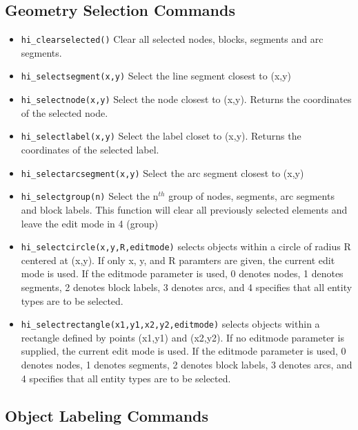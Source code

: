 \subsection{Geometry Selection Commands}

\begin{itemize}
\item {\tt hi\_clearselected()} Clear all selected nodes, blocks, segments and arc
segments.

\item {\tt hi\_selectsegment(x,y)} Select the line segment closest to (x,y)

\item {\tt hi\_selectnode(x,y)} Select the node closest to (x,y).
Returns the coordinates of the selected node.

\item {\tt hi\_selectlabel(x,y)} Select the label closet to (x,y).
Returns the coordinates of the selected label.

\item {\tt hi\_selectarcsegment(x,y)} Select the arc segment closest to (x,y)

\item {\tt hi\_selectgroup(n)} Select the n$^{th}$ group of nodes, segments, arc
segments and block labels. This function will clear all previously selected
elements and leave the edit mode in 4 (group)

\item{\tt hi\_selectcircle(x,y,R,editmode)} selects objects within a circle of radius
R centered at (x,y).  If only x, y, and R paramters are given, the current
edit mode is used.  If the editmode parameter is used, 0 denotes nodes, 1 denotes segments,
2 denotes block labels, 3 denotes arcs, and 4 specifies that all entity types are to be selected.

\item{\tt hi\_selectrectangle(x1,y1,x2,y2,editmode)} selects objects within a rectangle
defined by points (x1,y1) and (x2,y2). If no editmode parameter is supplied,
the current edit mode is used.  If the editmode parameter is used, 0 denotes nodes, 1 denotes segments,
2 denotes block labels, 3 denotes arcs, and 4 specifies that all entity types are to be selected.
\end{itemize}


\subsection{Object Labeling Commands}

